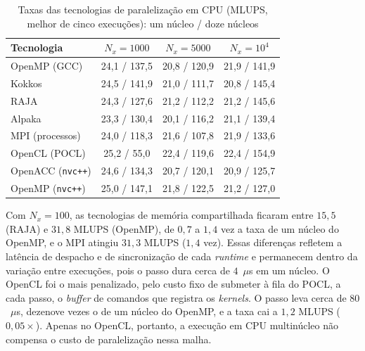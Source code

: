 \begin{table}[H]
    \centering
    \caption{Taxas das tecnologias de paralelização em CPU (MLUPS, melhor de cinco execuções): um núcleo / doze núcleos}
    \label{tab:desempenho-cpu-medido}
    \footnotesize
    \begin{tabular}{lccc}
        \toprule
        Tecnologia & \(N_x=1000\) & \(N_x=5000\) & \(N_x=10^4\) \\
        \midrule
        OpenMP (GCC) & 24{,}1 / 137{,}5 & 20{,}8 / 120{,}9 & 21{,}9 / 141{,}9 \\
        Kokkos & 24{,}5 / 141{,}9 & 21{,}0 / 111{,}7 & 20{,}8 / 145{,}4 \\
        RAJA & 24{,}3 / 127{,}6 & 21{,}2 / 112{,}2 & 21{,}2 / 145{,}6 \\
        Alpaka & 23{,}3 / 130{,}4 & 20{,}1 / 116{,}2 & 21{,}1 / 139{,}4 \\
        MPI (processos) & 24{,}0 / 118{,}3 & 21{,}6 / 107{,}8 & 21{,}9 / 133{,}6 \\
        OpenCL (POCL) & 25{,}2 / 55{,}0 & 22{,}4 / 119{,}6 & 22{,}4 / 154{,}9 \\
        OpenACC (\texttt{nvc++}) & 24{,}6 / 134{,}3 & 20{,}7 / 120{,}1 & 20{,}9 / 125{,}7 \\
        OpenMP (\texttt{nvc++}) & 25{,}0 / 147{,}1 & 21{,}8 / 122{,}5 & 21{,}2 / 127{,}0 \\
        \bottomrule
    \end{tabular}
\end{table}

Com \(N_x = 100\), as tecnologias de memória compartilhada ficaram entre \(15{,}5\) (RAJA) e \(31{,}8\) MLUPS (OpenMP), de \(0{,}7\) a \(1{,}4\) vez a taxa de um núcleo do OpenMP, e o MPI atingiu \(31{,}3\) MLUPS (\(1{,}4\) vez).
Essas diferenças refletem a latência de despacho e de sincronização de cada \textit{runtime} e permanecem dentro da variação entre execuções, pois o passo dura cerca de \(4\)~\(\mu\)s em um núcleo.
O OpenCL foi o mais penalizado, pelo custo fixo de submeter à fila do POCL, a cada passo, o \textit{buffer} de comandos que registra os \textit{kernels}.
O passo leva cerca de \(80\)~\(\mu\)s, dezenove vezes o de um núcleo do OpenMP, e a taxa cai a \(1{,}2\) MLUPS (\(0{,}05\times\)).
Apenas no OpenCL, portanto, a execução em CPU multinúcleo não compensa o custo de paralelização nessa malha.

